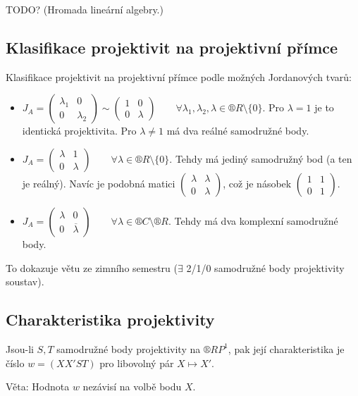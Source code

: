 \documentclass[12pt]{article}					%
\begin{document}
TODO? (Hromada lineární algebry.)

\subsection{Klasifikace projektivit na projektivní přímce}
\begin{poznamka}
	Klasifikace projektivit na projektivní přímce podle možných Jordanových tvarů:
	\begin{itemize}
		\item $J_A = \begin{pmatrix} λ_1 & 0 \\ 0 & λ_2 \end{pmatrix} \sim \begin{pmatrix} 1 & 0 \\ 0 & λ \end{pmatrix} \qquad \forall λ_1, λ_2, λ \in ®R \setminus \{0\}$. Pro $λ = 1$ je to identická projektivita. Pro $λ ≠ 1$ má dva reálné samodružné body.
		\item $J_A = \begin{pmatrix} λ & 1 \\ 0 & λ \end{pmatrix} \qquad \forall λ \in ®R \setminus \{0\}$. Tehdy má jediný samodružný bod (a ten je reálný). Navíc je podobná matici $\begin{pmatrix} λ & λ \\ 0 & λ \end{pmatrix}$, což je násobek $\begin{pmatrix} 1 & 1 \\ 0 & 1 \end{pmatrix}$.
		\item $J_A = \begin{pmatrix} λ & 0 \\ 0 & \overline{λ} \end{pmatrix} \qquad \forall λ \in ®C \setminus ®R$. Tehdy má dva komplexní samodružné body. 
	\end{itemize}
\end{poznamka}

\begin{dusledek}
	To dokazuje větu ze zimního semestru ($\exists$ 2/1/0 samodružné body projektivity soustav).
\end{dusledek}

\subsection{Charakteristika projektivity}
\begin{poznamka}
	Jsou-li $S, T$ samodružné body projektivity na $®RP^1$, pak její charakteristika je číslo $w = (XX'ST)$ pro libovolný pár $X \mapsto X'$.

	Věta: Hodnota $w$ nezávisí na volbě bodu $X$.
\end{poznamka}
\end{document}
